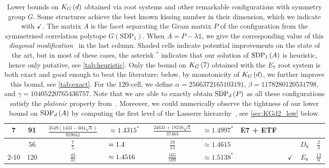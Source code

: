 \documentclass[10pt,aps,notitlepage,onecolumn,pra,superscriptaddress]{revtex4-1}
\newcommand{\cc}{\cellcolor[gray]{0.9}}
\newcommand\cut[2]{\mathrm{SDP}_{#1}^{#2}}
\newcommand{\id}{\mathds{1}}
\newcommand\KG[2]{K_G\left({#1}\ifx#2\empty\else\mapsto\fi{#2}\right)}
\newcommand\sdp[2]{\mathrm{SDP}_{#1}\ifx#2\empty\else\left({#2}\right)\fi}
\begin{document}
\begin{table}[ht!]
\begin{tabular}{|c|c|cl|cl|c|c|c|c|}
    \multirow{-4}{*}{7}  & 91                  & ~$\frac{3549(1433-604\sqrt3)}{959041}$~ & $\approx1.4315^*$                        & \cc~$\frac{24631+18216\sqrt3}{37463}$~    & \cc$\approx1.4997^*$                      & E7 + ETF~\cite{FJM18} &              &                         &                          \\ \hline
                         & 56                  & $\frac75$                               & $=1.4\hphantom{000^*}$~\cite{FR94}       & $\frac{19}{13}$                           & $\approx1.4615$                           &                       &              & $D_8$                   & $\frac23$                \\ \cline{2-10}
    \multirow{-2}{*}{8}  & 120                 & $\frac{45}{31}$                         & $\approx1.4516\hphantom{^*}$~\cite{FR94} & \cc$\frac{165}{109}$                      & \cc$\approx1.5138^*$                      &                       & $\checkmark$ & $E_8$                   & $\frac{13}{6}$           \\ \hline
  \end{tabular}
  \caption{
    Lower bounds on $\KG{d}{}$ obtained via root systems and other remarkable configurations with symmetry group $G$.
    Some structures achieve the best known kissing number in their dimension, which we indicate with $\checkmark$.
    The matrix $A$ is the facet separating the Gram matrix $P$ of the configuration from the symmetrised correlation polytope $G(\cut{1}{})$.
    When $A=P-\lambda\id$, we give the corresponding value of this \emph{diagonal modification}~\cite{FR94} in the last column.
    Shaded cells indicate potential improvements on the state of the art, but in most of these cases, the asterisk $^*$ indicates that our solution of $\sdp{1}{A}$ is heuristic, hence only putative, see \cref{tab:heuristic}.
    Only the bound on $\KG{7}{}$ obtained with the $E_7$ root system is both exact and good enough to beat the literature; below, by monotonicity of $\KG{d}{}$, we further improve this bound, see \cref{tab:exact}.
    For the 120-cell, we define $\alpha=2566372165103191$, $\beta=1178280120531798$, and $\gamma=10405220765436757$.
    Note that we are able to exactly obtain $\sdp{d}{P}$ as all these configurations satisfy the \emph{platonic} property from~\cite{PV22}.
    Moreover, we could numerically observe the tightness of our lower bound on $\sdp{d}{A}$ by computing the first level of the Lasserre hierarchy~\cite{Las01}, see \cref{sec:KGd2_low} below.
  }
  \label{tab:sym}
\end{table}
\end{document}
